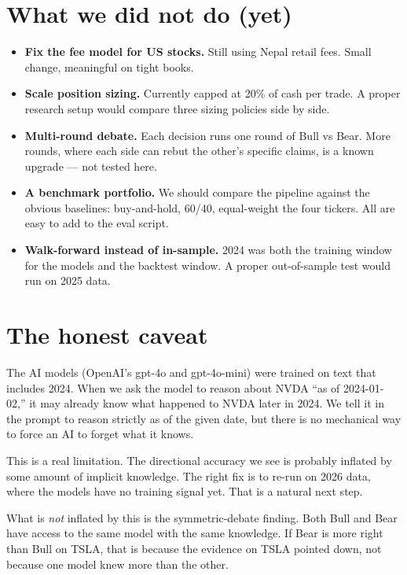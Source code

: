 \documentclass[11pt,a4paper]{article}
\begin{document}
\section{What we did not do (yet)}

\begin{itemize}
\item \textbf{Fix the fee model for US stocks.} Still using Nepal retail
fees. Small change, meaningful on tight books.
\item \textbf{Scale position sizing.} Currently capped at 20\% of cash
per trade. A proper research setup would compare three sizing policies
side by side.
\item \textbf{Multi-round debate.} Each decision runs one round of Bull
vs Bear. More rounds, where each side can rebut the other's specific
claims, is a known upgrade --- not tested here.
\item \textbf{A benchmark portfolio.} We should compare the pipeline
against the obvious baselines: buy-and-hold, 60/40, equal-weight the
four tickers. All are easy to add to the eval script.
\item \textbf{Walk-forward instead of in-sample.} 2024 was both the
training window for the models and the backtest window. A proper
out-of-sample test would run on 2025 data.
\end{itemize}

\section{The honest caveat}

The AI models (OpenAI's gpt-4o and gpt-4o-mini) were trained on text that
includes 2024. When we ask the model to reason about NVDA ``as of
2024-01-02,'' it may already know what happened to NVDA later in 2024.
We tell it in the prompt to reason strictly as of the given date, but
there is no mechanical way to force an AI to forget what it knows.

This is a real limitation. The directional accuracy we see is probably
inflated by some amount of implicit knowledge. The right fix is to re-run
on 2026 data, where the models have no training signal yet. That is a
natural next step.

What is \textit{not} inflated by this is the symmetric-debate finding.
Both Bull and Bear have access to the same model with the same knowledge.
If Bear is more right than Bull on TSLA, that is because the evidence on
TSLA pointed down, not because one model knew more than the other.
\end{document}
